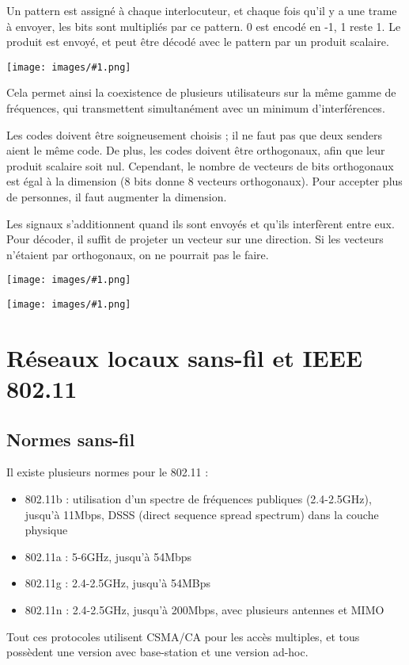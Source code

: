 \documentclass[10pt,a4paper]{report}
\newcommand{\dessinS}[2]{\begin{center}\texttt{[image: images/\#1.png]}\end{center}}
\begin{document}
		Un pattern est assigné à chaque interlocuteur, et chaque fois qu'il y a une trame à envoyer, les bits sont multipliés par ce pattern. 0 est encodé en -1, 1 reste 1. Le produit est envoyé, et peut être décodé avec le pattern par un produit scalaire.
		
		\dessinS{31}{.95}
		
		Cela permet ainsi la coexistence de plusieurs utilisateurs sur la même gamme de fréquences, qui transmettent simultanément avec un minimum d'interférences.
		
		Les codes doivent être soigneusement choisis ; il ne faut pas que deux senders aient le même code. De plus, les codes doivent être orthogonaux, afin que leur produit scalaire soit nul. Cependant, le nombre de vecteurs de bits orthogonaux est égal à la dimension (8 bits donne 8 vecteurs orthogonaux). Pour accepter plus de personnes, il faut augmenter la dimension.
		
		Les signaux s'additionnent quand ils sont envoyés et qu'ils interfèrent entre eux. Pour décoder, il suffit de projeter un vecteur sur une direction. Si les vecteurs n'étaient par orthogonaux, on ne pourrait pas le faire.
		
		\dessinS{32}{1}
		
		\dessinS{33}{.5}
		
	\section{Réseaux locaux sans-fil et IEEE 802.11}
	
		\subsection{Normes sans-fil}
		Il existe plusieurs normes pour le 802.11 :
	
		\begin{itemize}
			\item 802.11b : utilisation d'un spectre de fréquences publiques (2.4-2.5GHz), jusqu'à 11Mbps, DSSS (direct sequence spread spectrum) dans la couche physique
			\item 802.11a :  5-6GHz, jusqu'à 54Mbps
			\item 802.11g : 2.4-2.5GHz, jusqu'à 54MBps
			\item 802.11n : 2.4-2.5GHz, jusqu'à 200Mbps, avec plusieurs antennes et MIMO
		\end{itemize}
	
		Tout ces protocoles utilisent CSMA/CA pour les accès multiples, et tous possèdent une version avec base-station et une version ad-hoc.
		
\end{document}
